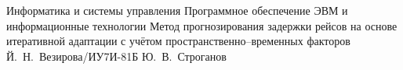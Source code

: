 \documentclass{bmstu}
\begin{document}
    \makethesistitle
    {Информатика и системы управления} %
    {Программное обеспечение ЭВМ и информационные технологии} %
    {Метод прогнозирования задержки рейсов на основе итеративной адаптации с учётом пространственно--временных факторов} %
    {Й.~Н.~Везирова/ИУ7И-81Б} %
    {Ю.~В.~Строганов} %
    {} %
    {} %

    \setcounter{page}{3}

%    

%    

    \maketableofcontents

%    
%    

    
    
    
    
    
    

    \makebibliography

%    

%    
\end{document}
